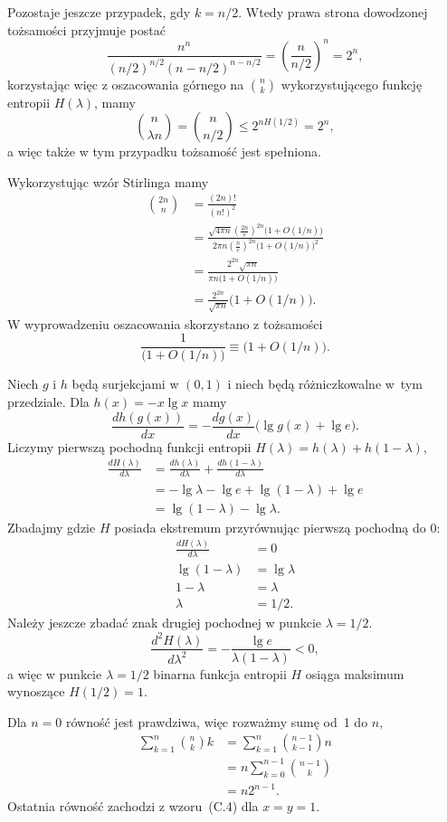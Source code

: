 Pozostaje jeszcze przypadek, gdy $k=n/2$. Wtedy prawa strona dowodzonej tożsamości przyjmuje postać
\[
	\frac{n^n}{(n/2)^{n/2}(n-n/2)^{n-n/2}} = \left(\frac{n}{n/2}\right)^n = 2^n,
\]
korzystając więc z oszacowania górnego na $\binom{n}{k}$ wykorzystującego funkcję entropii $H(\lambda)$, mamy
\[
	\binom{n}{\lambda n} = \binom{n}{n/2} \le 2^{nH(1/2)} = 2^n,
\]
a więc także w tym przypadku tożsamość jest spełniona.

\exercise{} %
\noindent Wykorzystując wzór Stirlinga mamy
\begin{align*}
	\binom{2n}{n} &= \frac{(2n)!}{(n!)^2} \\
	&= \frac{\sqrt{4\pi n}\left(\frac{2n}{e}\right)^{2n}\bigl(1+O(1/n)\bigr)}{2\pi n\left(\frac{n}{e}\right)^{2n}\bigl(1+O(1/n)\bigr)^2} \\[1mm]
	&= \frac{2^{2n}\sqrt{\pi n}}{\pi n\bigl(1+O(1/n)\bigr)} \\[1mm]
	&= \frac{2^{2n}}{\sqrt{\pi n}}\bigl(1+O(1/n)\bigr).
\end{align*}
W wyprowadzeniu oszacowania skorzystano z tożsamości
\[
	\frac{1}{\bigl(1+O(1/n)\bigr)} \equiv \bigl(1+O(1/n)\bigr).
\]

\exercise{} %
\noindent Niech $g$ i $h$ będą surjekcjami w $(0,1)$ i niech będą różniczkowalne w~tym przedziale. Dla $h(x)=-x\lg x$ mamy
\[
	\frac{dh(g(x))}{dx} = -\frac{dg(x)}{dx}\bigl(\lg g(x)+\lg e\bigr).
\]
Liczymy pierwszą pochodną funkcji entropii $H(\lambda)=h(\lambda)+h(1-\lambda)$,
\begin{align*}
	\frac{dH(\lambda)}{d\lambda} &= \frac{dh(\lambda)}{d\lambda}+\frac{dh(1-\lambda)}{d\lambda} \\
	&= -\lg\lambda-\lg e+\lg(1-\lambda)+\lg e \\
	&= \lg(1-\lambda)-\lg\lambda.
\end{align*}
Zbadajmy gdzie $H$ posiada ekstremum przyrównując pierwszą pochodną do 0:
\begin{align*}
	\frac{dH(\lambda)}{d\lambda} &= 0 \\
	\lg(1-\lambda) &= \lg\lambda \\
	1-\lambda &= \lambda \\
	\lambda &= 1/2.
\end{align*}
Należy jeszcze zbadać znak drugiej pochodnej w punkcie $\lambda=1/2$.
\[
	\frac{d^2H(\lambda)}{d\lambda^2} = -\frac{\lg e}{\lambda(1-\lambda)} < 0,
\]
a więc w punkcie $\lambda=1/2$ binarna funkcja entropii $H$ osiąga maksimum wynoszące $H(1/2)=1$.

\exercise{} %
\noindent Dla $n=0$ równość jest prawdziwa, więc rozważmy sumę od~1 do $n$,
\begin{align*}
	\sum_{k=1}^n\binom{n}{k}k &= \sum_{k=1}^n\binom{n-1}{k-1}n \\
	&= n\sum_{k=0}^{n-1}\binom{n-1}{k} \\
	&= n2^{n-1}.
\end{align*}
Ostatnia równość zachodzi z wzoru~(C.4) dla $x=y=1$.

